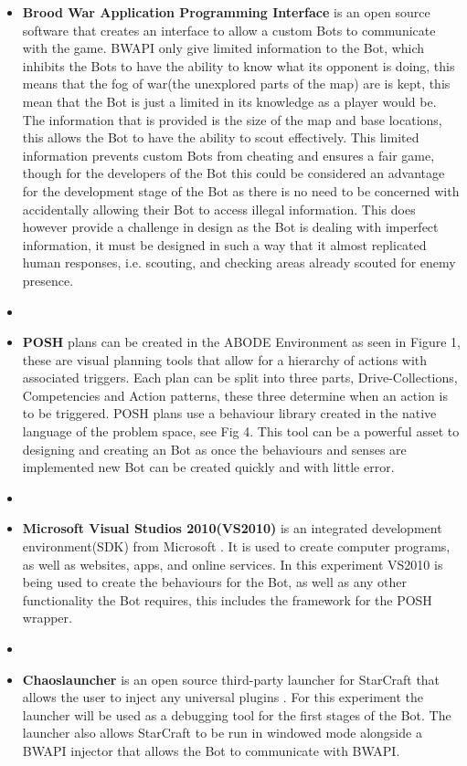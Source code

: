 \documentclass[journal]{IEEEtran}
\begin{document}
\begin{itemize}
	\item \textbf{Brood War Application Programming Interface} \cite{BWAPI} is an open source software that creates an interface to allow a custom Bots to communicate with the game. BWAPI only give limited information to the Bot, which inhibits the Bots to have the ability to know what its opponent is doing, this means that the fog of war(the unexplored parts of the map) are is kept\cite{POSH}, this mean that the Bot is just a limited in its knowledge as a player would be. The information that is provided is the size of the map and base locations, this allows the Bot to have the ability to scout effectively. This limited information prevents custom Bots from cheating and ensures a fair game, though for the developers of the Bot this could be considered an advantage for the development stage of the Bot as there is no need to be concerned with accidentally allowing their Bot to access illegal information. This does however provide a challenge in design as the Bot is dealing with imperfect information, it must be designed in such a way that it almost replicated human responses, i.e. scouting, and checking areas already scouted for enemy presence.
	\item[]
	\item \textbf{POSH} plans can be created in the ABODE Environment as seen in Figure 1, these are visual planning tools that allow for a hierarchy of actions with associated triggers. Each plan can be split into three parts, Drive-Collections, Competencies and Action patterns, these three determine when an action is to be triggered. POSH plans use a behaviour library created in the native language of the problem space, see Fig 4. This tool can be a powerful asset to designing and creating an Bot as once the behaviours and senses are implemented new Bot can be created quickly and with little error.
	\item[]
	\item \textbf{Microsoft Visual Studios 2010(VS2010)} is an integrated development environment(SDK) from Microsoft \cite{Visual}. It is used to create computer programs, as well as websites, apps, and online services. In this experiment VS2010 is being used to create the behaviours for the Bot, as well as any other functionality the Bot requires, this includes the framework for the POSH wrapper.
	\item[]
	\item \textbf{Chaoslauncher} is an open source third-party launcher for StarCraft that allows the user to inject any universal plugins \cite{Chaos}. For this experiment the launcher will be used as a debugging tool for the first stages of the Bot. The launcher also allows StarCraft to be run in windowed mode alongside a BWAPI injector that allows the Bot to communicate with BWAPI.	

\end{itemize}
\end{document}
